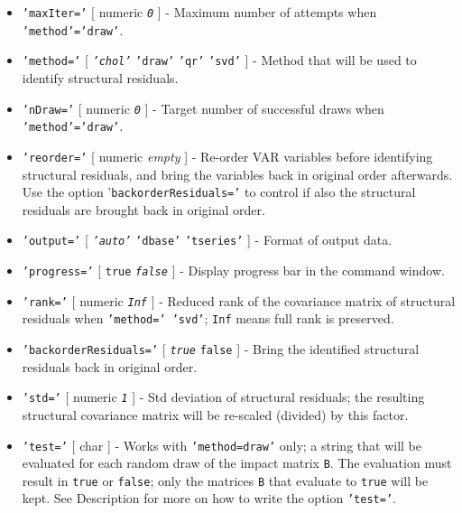  \begin{itemize}
 \item
   \texttt{'maxIter='} {[} numeric \textbar{} \emph{\texttt{0}} {]} -
   Maximum number of attempts when \texttt{'method'='draw'}.
 \item
   \texttt{'method='} {[} \emph{\texttt{'chol'}} \textbar{}
   \texttt{'draw'} \textbar{} \texttt{'qr'} \textbar{} \texttt{'svd'} {]}
   - Method that will be used to identify structural residuals.
 \item
   \texttt{'nDraw='} {[} numeric \textbar{} \emph{\texttt{0}} {]} -
   Target number of successful draws when \texttt{'method'='draw'}.
 \item
   \texttt{'reorder='} {[} numeric \textbar{} \emph{empty} {]} - Re-order
   VAR variables before identifying structural residuals, and bring the
   variables back in original order afterwards. Use the option
   '\texttt{backorderResiduals='} to control if also the structural
   residuals are brought back in original order.
 \item
   \texttt{'output='} {[} \emph{\texttt{'auto'}} \textbar{}
   \texttt{'dbase'} \textbar{} \texttt{'tseries'} {]} - Format of output
   data.
 \item
   \texttt{'progress='} {[} \texttt{true} \textbar{}
   \emph{\texttt{false}} {]} - Display progress bar in the command
   window.
 \item
   \texttt{'rank='} {[} numeric \textbar{} \emph{\texttt{Inf}} {]} -
   Reduced rank of the covariance matrix of structural residuals when
   \texttt{'method=' 'svd'}; \texttt{Inf} means full rank is preserved.
 \item
   \texttt{'backorderResiduals='} {[} \emph{\texttt{true}} \textbar{}
   \texttt{false} {]} - Bring the identified structural residuals back in
   original order.
 \item
   \texttt{'std='} {[} numeric \textbar{} \emph{\texttt{1}} {]} - Std
   deviation of structural residuals; the resulting structural covariance
   matrix will be re-scaled (divided) by this factor.
 \item
   \texttt{'test='} {[} char {]} - Works with \texttt{'method=draw'}
   only; a string that will be evaluated for each random draw of the
   impact matrix \texttt{B}. The evaluation must result in \texttt{true}
   or \texttt{false}; only the matrices \texttt{B} that evaluate to
   \texttt{true} will be kept. See Description for more on how to write
   the option \texttt{'test='}.
 \end{itemize}
 
